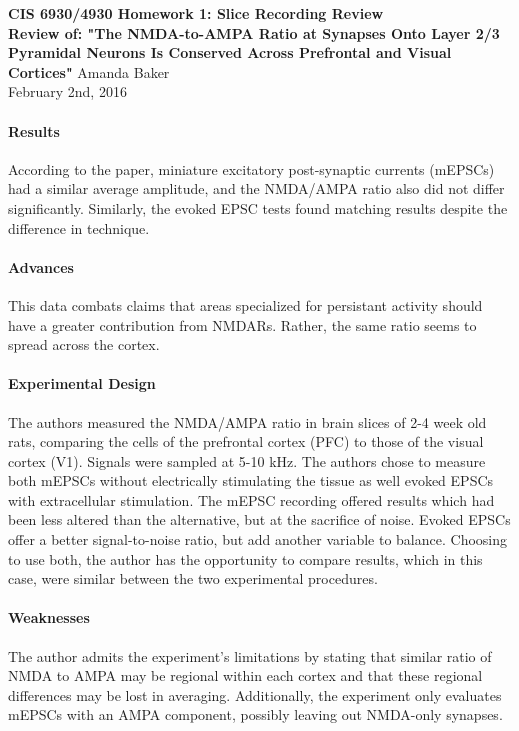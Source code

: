 \documentclass[11pt]{article}
\begin{document}
\begin{center}
{\large {\bf CIS 6930/4930 Homework 1: Slice Recording Review}}\\
{\normalsize {\bf Review of: "The NMDA-to-AMPA Ratio at Synapses Onto Layer 2/3 Pyramidal Neurons
Is Conserved Across Prefrontal and Visual Cortices"}}
Amanda Baker \\
February 2nd, 2016 \\
\end{center}

\paragraph{Results}
According to the paper, miniature excitatory post-synaptic currents (mEPSCs) had
a similar average amplitude, and the NMDA/AMPA ratio also did not differ significantly.
Similarly, the evoked EPSC tests found matching results despite the difference in
technique. \\

\paragraph{Advances}
This data combats claims that areas specialized for persistant activity should have
a greater contribution from NMDARs.  Rather, the same ratio seems to spread across
the cortex. \\

\paragraph{Experimental Design}
The authors measured the NMDA/AMPA ratio in brain slices of 2-4 week old rats, comparing
the cells of the prefrontal cortex (PFC) to those of the visual cortex (V1).  Signals
were sampled at 5-10 kHz.  The authors chose to measure both mEPSCs without electrically
stimulating the tissue as well evoked EPSCs with extracellular stimulation.  The mEPSC
recording offered results which had been less altered than the alternative, but at
the sacrifice of noise.  Evoked EPSCs offer a better signal-to-noise ratio, but add
another variable to balance.  Choosing to use both, the author has the opportunity
to compare results, which in this case, were similar between the two experimental
procedures. \\

\paragraph{Weaknesses}
The author admits the experiment's limitations by stating that similar ratio of NMDA
to AMPA may be regional within each cortex and that these regional differences may
be lost in averaging.  Additionally, the experiment only evaluates mEPSCs with an
AMPA component, possibly leaving out NMDA-only synapses.  \\
\end{document}
